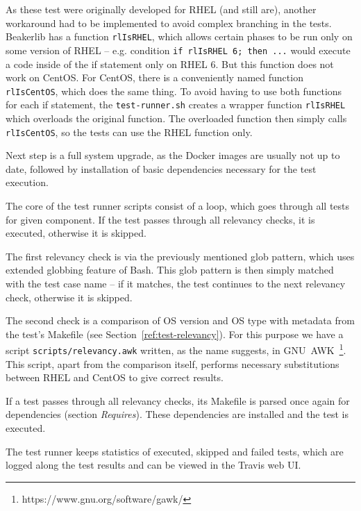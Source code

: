     As these test were originally developed for RHEL (and still are),
    another workaround had to be implemented to avoid complex branching in
    the tests. Beakerlib
    has a function \texttt{rlIsRHEL}, which allows certain phases to be
    run only on some version of RHEL -- e.g. condition
    \texttt{if rlIsRHEL 6; then ...} would execute a code inside of the if
    statement only on RHEL 6. But this function does not work on CentOS. For
    CentOS, there is a conveniently named function \texttt{rlIsCentOS}, which
    does the same thing. To avoid having to use both functions for each
    if statement, the \texttt{test-runner.sh} creates a wrapper function
    \texttt{rlIsRHEL} which overloads the original function. The overloaded
    function then simply calls \texttt{rlIsCentOS}, so the tests can use
    the RHEL function only.

    Next step is a full system upgrade, as the Docker images are usually not
    up to date, followed by installation of basic dependencies necessary
    for the test execution.

    The core of the test runner scripts consist of a loop, which goes through
    all tests for given component. If the test passes through all relevancy
    checks, it is executed, otherwise it is skipped.

    The first relevancy check is via the previously mentioned glob pattern,
    which uses extended globbing feature of Bash. This glob pattern is then
    simply matched with the test case name -- if it matches, the test continues
    to the next relevancy check, otherwise it is skipped.

    The second check is a comparison of OS version and OS type with metadata
    from the test's Makefile (see Section~\ref{ref:test-relevancy}). For this
    purpose we have a script \texttt{scripts/relevancy.awk} written, as the
    name suggests, in GNU~AWK~\footnote{https://www.gnu.org/software/gawk/}.
    This script, apart from the comparison itself, performs necessary
    substitutions between RHEL and CentOS to give correct results.

    If a test passes through all relevancy checks, its Makefile is parsed once
    again for dependencies (section \textit{Requires}). These dependencies
    are installed and the test is executed.

    The test runner keeps statistics of executed, skipped and failed tests,
    which are logged along the test results and can be viewed in the Travis
    web UI.

